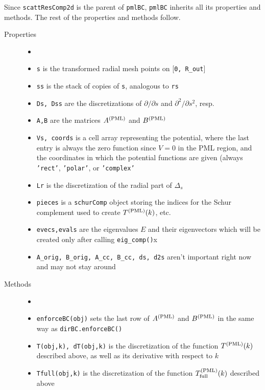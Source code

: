 Since {\tt scattResComp2d} is the parent of {\tt pmlBC},
{\tt pmlBC} inherits all its properties and methods. The rest of the
properties and methods follow.
\begin{description}
 \item[Properties]
   \begin{itemize}
    \item[]
    \item {\tt s} is the transformed radial mesh points on [{\tt 0, R\_out}]
    \item {\tt ss} is the stack of copies of {\tt s}, analogous to {\tt rs}
    \item {\tt Ds, Dss} are the discretizations of
          $\partial/\partial s$ and $\partial^2/\partial s^2$, resp.
    \item {\tt A,B} are the matrices $A^{(\text{PML})}$ and $B^{(\text{PML})}$
    \item {\tt Vs, coords} is a cell array representing the potential, where
          the last entry is always the zero function since $V = 0$
          in the PML region, and the coordinates in which the potential
          functions are given (always {\tt 'rect'}, {\tt 'polar'}, or
          {\tt 'complex'}
    \item {\tt Lr} is the discretization of the radial part of
          $\Delta_s$
    \item {\tt pieces} is a {\tt schurComp} object storing the indices
          for the Schur complement used to create $T^{(\text{PML})}(k)$, etc.
    \item {\tt evecs,evals} are the eigenvalues $E$ and their eigenvectors
          which will be created only after calling {\tt eig\_comp()}x
    \item {\tt A\_orig, B\_orig, A\_cc, B\_cc, ds, d2s} aren't
          important right now and may not stay around
	\end{itemize}
 \item[Methods]
   \begin{itemize}
    \item[]
    \item {\tt enforceBC(obj)} sets the last row of $A^{(\text{PML})}$ and $B^{(\text{PML})}$
	  in the same way as {\tt dirBC.enforceBC()}
    \item {\tt T(obj,k), dT(obj,k)} is the discretization of
	  the function $T^{(\text{PML})}(k)$
	  described above, as well as its derivative with respect to $k$
    \item {\tt Tfull(obj,k)} is the discretization of the
	  function $T^{(\text{PML})}_{\text{full}}(k)$
          described above

\end{itemize}
\end{description}
